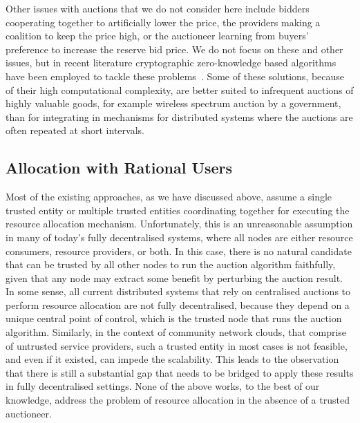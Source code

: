 Other issues with auctions that we do not consider here include bidders cooperating
together to artificially lower the price, 
the providers making a coalition to keep the price high,
or the auctioneer learning from buyers' preference to increase the reserve bid price.
We do not focus on these and other issues, but in recent literature
cryptographic zero-knowledge based algorithms have been 
employed to tackle these problems~\cite{Micali2014, Lipmaa2003}.
Some of these solutions, because of their high computational complexity,
are better suited to infrequent auctions of highly valuable goods,
for example wireless spectrum auction by a government,
than for integrating in mechanisms for distributed systems
where the auctions are often repeated at short intervals.


\subsection{Allocation with Rational Users}
\label{sec__allocation_rational}

Most of the existing approaches, as we have discussed above, assume a single trusted entity 
or multiple trusted entities coordinating together
for executing the resource allocation mechanism. 
Unfortunately, this is an unreasonable assumption in many of today's fully
decentralised systems, where all nodes are either resource consumers,
resource providers, or both. 
In this case, there is no natural candidate that 
can be trusted by all other nodes to run the auction
algorithm faithfully, given that any node may extract some
benefit by perturbing the auction result. 
In some sense, all current distributed systems that 
rely on centralised auctions to perform resource
allocation are not fully decentralised, 
because they depend on a unique central point of control, 
which is the trusted node that runs the auction algorithm. 
Similarly, in the context of community network clouds, 
that comprise of untrusted service providers,
such a trusted entity in most cases is not feasible, 
and even if it existed, can impede the scalability.
This leads to the observation that there is
still a substantial gap that needs to be bridged to apply these
results in fully decentralised settings.
None of the above works, to the best of our knowledge, 
address the problem of resource allocation
in the absence of a trusted auctioneer.


